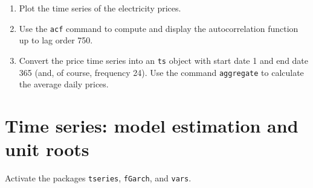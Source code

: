 \documentclass{article}
\begin{document}
\begin{enumerate}
\begin{enumerate}
\item Plot the time series of the electricity prices.

\item Use the \texttt{acf} command to compute and display the
autocorrelation function up to lag order 750.

\item Convert the price time series into an \texttt{ts} object with start
date 1 and end date 365 (and, of course, frequency 24). Use the command 
\texttt{aggregate} to calculate the average daily prices.
\end{enumerate}
\end{enumerate}
\newpage


\section{Time series: model estimation and unit roots}

Activate the packages \texttt{tseries}, \texttt{fGarch}, and \texttt{vars}.
\end{document}
